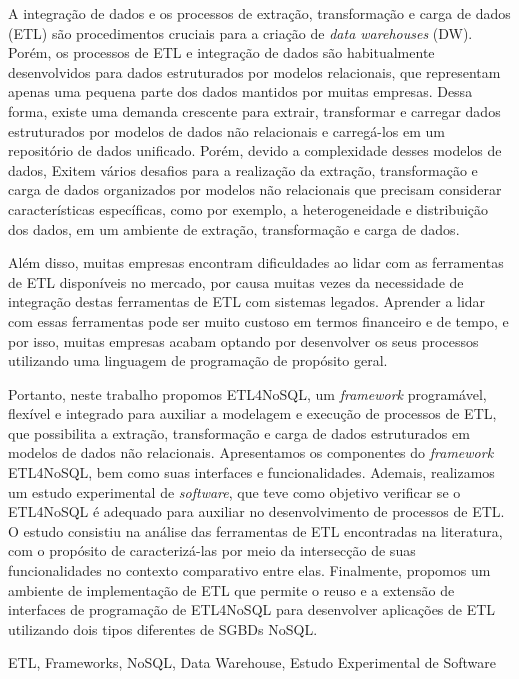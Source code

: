 
A integração de dados e os processos de extração, transformação e carga de dados (ETL) são procedimentos cruciais para a criação de \textit{data warehouses} (DW). Porém, os processos de ETL e integração de dados são habitualmente desenvolvidos para dados estruturados por modelos relacionais, que representam apenas uma pequena parte dos dados mantidos por muitas empresas. Dessa forma, existe uma demanda crescente para extrair, transformar e carregar dados estruturados por modelos de dados não relacionais e carregá-los em um repositório de dados unificado. Porém, devido a complexidade desses modelos de dados, Exitem vários desafios para a realização da extração, transformação e carga de dados organizados por modelos não relacionais que precisam considerar características específicas, como por exemplo, a heterogeneidade e distribuição dos dados, em um ambiente de extração, transformação e carga de dados.

Além disso, muitas empresas encontram dificuldades ao lidar com as ferramentas de ETL disponíveis no mercado, por causa muitas vezes da necessidade de integração destas ferramentas de ETL com sistemas legados. Aprender a lidar com essas ferramentas pode ser muito custoso em termos financeiro e de tempo, e por isso, muitas empresas acabam optando por desenvolver os seus processos utilizando uma linguagem de programação de propósito geral.

Portanto, neste trabalho propomos ETL4NoSQL, um \textit{framework} programável, flexível e integrado para auxiliar a modelagem e execução de processos de ETL, que possibilita a extração, transformação e carga de dados estruturados em modelos de dados não relacionais. Apresentamos os componentes do \textit{framework} ETL4NoSQL, bem como suas interfaces e funcionalidades. Ademais, realizamos um estudo experimental de \textit{software}, que teve como objetivo verificar se o ETL4NoSQL é adequado para auxiliar no desenvolvimento de processos de ETL. O estudo consistiu na análise das ferramentas de ETL encontradas na literatura, com o propósito de caracterizá-las por meio da intersecção de suas funcionalidades no contexto comparativo entre elas. Finalmente, propomos um ambiente de implementação de ETL que permite o reuso e a extensão de interfaces de programação de ETL4NoSQL para desenvolver aplicações de ETL utilizando dois tipos diferentes de SGBDs NoSQL.


\begin{keywords}
ETL, Frameworks, NoSQL, Data Warehouse, Estudo Experimental de Software
\end{keywords}
